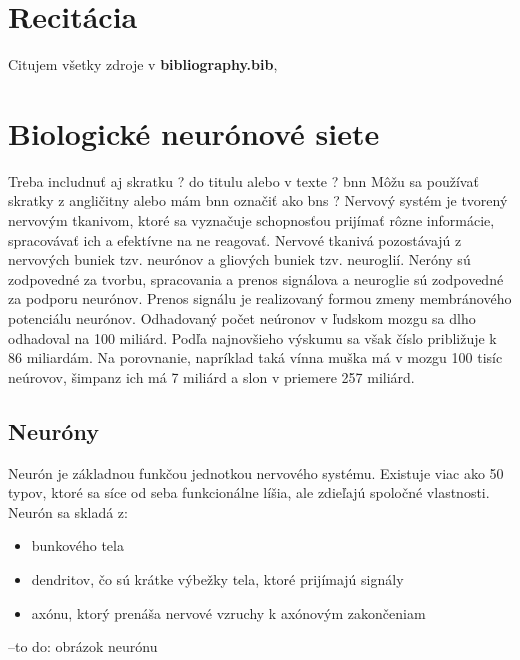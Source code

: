 
\section{Recitácia}
Citujem všetky zdroje v 
\textbf{bibliography.bib}, 
\newline 

\section{Biologické neurónové siete}
Treba includnuť aj skratku ? do titulu alebo v texte ? \acrlong{bnn} Môžu sa používať skratky z angličitny alebo mám bnn označiť ako bns ? 
\newline
\newline
Nervový systém je tvorený nervovým tkanivom, ktoré sa vyznačuje schopnosťou prijímať rôzne informácie, spracovávať ich a efektívne na ne reagovať.
\newline
Nervové tkanivá pozostávajú z nervových buniek tzv. neurónov a gliových buniek tzv. neuroglií.
Neróny sú zodpovedné za tvorbu, spracovania a prenos signálova a neuroglie sú zodpovedné za podporu neurónov.
Prenos signálu je realizovaný formou zmeny membránového potenciálu neurónov.
\newline
Odhadovaný počet neúronov v ľudskom mozgu sa dlho odhadoval na 100 miliárd. Podľa najnovšieho výskumu sa však číslo približuje k 86 miliardám.
Na porovnanie, napríklad taká vínna muška má v mozgu 100 tisíc neúrovov, šimpanz ich má 7 miliárd a slon v priemere 257 miliárd.
\subsection{Neuróny}
Neurón je základnou funkčou jednotkou nervového systému. Existuje viac ako 50 typov, ktoré sa síce
od seba funkcionálne líšia, ale zdieľajú spoločné vlastnosti.
\newline
Neurón sa skladá z: 
\begin{itemize}
  \item bunkového tela
  \item dendritov, čo sú krátke výbežky tela, ktoré prijímajú signály
  \item axónu, ktorý prenáša nervové vzruchy k axónovým zakončeniam
\end{itemize}
\newline
--to do: obrázok neurónu
